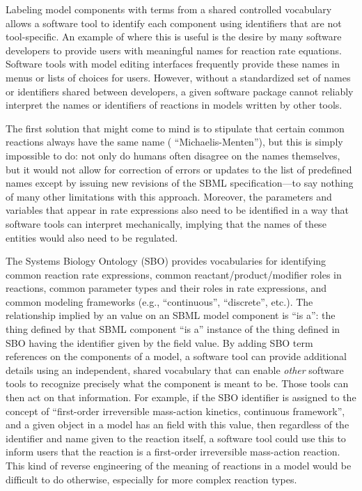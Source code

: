 Labeling model components with terms from a shared controlled
vocabulary allows a software tool to identify each component using
identifiers that are not tool-specific.  An example of where this
is useful is the desire by many software developers to provide
users with meaningful names for reaction rate equations.  Software
tools with model editing interfaces frequently provide these names
in menus or lists of choices for users.  However, without a
standardized set of names or identifiers shared between
developers, a given software package cannot reliably interpret the
names or identifiers of reactions in models written by other
tools.

The first solution that might come to mind is to stipulate that
certain common reactions always have the same name (\eg
``Michaelis-Menten''), but this is simply impossible to do: not
only do humans often disagree on the names themselves, but it
would not allow for correction of errors or updates to the list of
predefined names except by issuing new revisions of the SBML
specification---to say nothing of many other limitations with this
approach.  Moreover, the parameters and variables that appear in
rate expressions also need to be identified in a way that software
tools can interpret mechanically, implying that the names of these
entities would also need to be regulated.

The Systems Biology Ontology (SBO) provides vocabularies for
identifying common reaction rate expressions, common
reactant/product/modifier roles in reactions, common parameter
types and their roles in rate expressions, and common modeling
frameworks (e.g., ``continuous'', ``discrete'', etc.).  The
relationship implied by an  value on an SBML model
component is ``is a'': the thing defined by that SBML component
``is a'' instance of the thing defined in SBO having the
identifier given by the  field value.  By adding
SBO term references on the components of a model, a software tool
can provide additional details using an independent, shared
vocabulary that can enable \emph{other} software tools to
recognize precisely what the component is meant to be.  Those
tools can then act on that information.  For example, if the SBO
identifier  is assigned to the concept of
``first-order irreversible mass-action kinetics, continuous
framework'', and a given \KineticLaw object in a model has an
 field with this value, then regardless of the
identifier and name given to the reaction itself, a software tool
could use this to inform users that the reaction is a first-order
irreversible mass-action reaction.  This kind of reverse
engineering of the meaning of reactions in a model would be
difficult to do otherwise, especially for more complex reaction
types.

